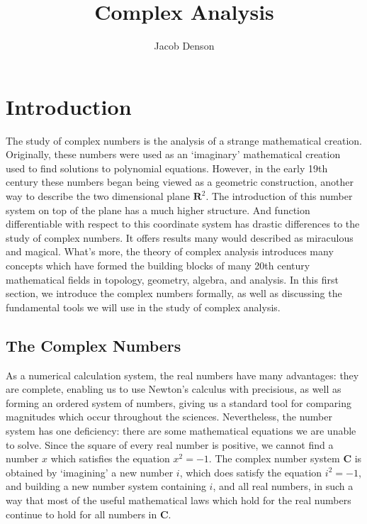 

\title{Complex Analysis}
\author{Jacob Denson}



\maketitle
\tableofcontents
{}

\chapter{Introduction}

The study of complex numbers is the analysis of a strange mathematical creation. Originally, these numbers were used as an `imaginary' mathematical creation used to find solutions to polynomial equations. However, in the early 19th century these numbers began being viewed as a geometric construction, another way to describe the two dimensional plane $\mathbf{R}^2$. The introduction of this number system on top of the plane has a much higher structure. And function differentiable with respect to this coordinate system has drastic differences to the study of complex numbers. It offers results many would described as miraculous and magical. What's more, the theory of complex analysis introduces many concepts which have formed the building blocks of many 20th century mathematical fields in topology, geometry, algebra, and analysis. In this first section, we introduce the complex numbers formally, as well as discussing the fundamental tools we will use in the study of complex analysis.

\section{The Complex Numbers}

As a numerical calculation system, the real numbers have many advantages: they are complete, enabling us to use Newton's calculus with precisious, as well as forming an ordered system of numbers, giving us a standard tool for comparing magnitudes which occur throughout the sciences. Nevertheless, the number system has one deficiency: there are some mathematical equations we are unable to solve. Since the square of every real number is positive, we cannot find a number $x$ which satisfies the equation $x^2 = -1$. The complex number system $\mathbf{C}$ is obtained by `imagining' a new number $i$, which does satisfy the equation $i^2 = -1$, and building a new number system containing $i$, and all real numbers, in such a way that most of the useful mathematical laws which hold for the real numbers continue to hold for all numbers in $\mathbf{C}$.

